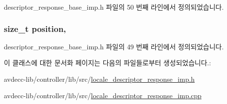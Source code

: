 descriptor\+\_\+response\+\_\+base\+\_\+imp.\+h 파일의 50 번째 라인에서 정의되었습니다.

\subsubsection[{\texorpdfstring{position}{position}}]{\setlength{\rightskip}{0pt plus 5cm}size\+\_\+t position\hspace{0.3cm}{\ttfamily [protected]}, {\ttfamily [inherited]}}\hypertarget{classavdecc__lib_1_1descriptor__response__base__imp_a7a04afe5347934be732ec70a70bd0a28}{}\label{classavdecc__lib_1_1descriptor__response__base__imp_a7a04afe5347934be732ec70a70bd0a28}


descriptor\+\_\+response\+\_\+base\+\_\+imp.\+h 파일의 49 번째 라인에서 정의되었습니다.



이 클래스에 대한 문서화 페이지는 다음의 파일들로부터 생성되었습니다.\+:\begin{DoxyCompactItemize}
\item 
avdecc-\/lib/controller/lib/src/\hyperlink{locale__descriptor__response__imp_8h}{locale\+\_\+descriptor\+\_\+response\+\_\+imp.\+h}\item 
avdecc-\/lib/controller/lib/src/\hyperlink{locale__descriptor__response__imp_8cpp}{locale\+\_\+descriptor\+\_\+response\+\_\+imp.\+cpp}\end{DoxyCompactItemize}
